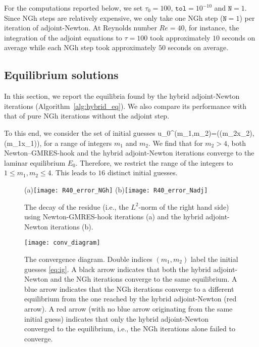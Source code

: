 \documentclass{jfm}
\begin{document}
For the computations reported below, we set $\tau_0=100$, $\texttt{tol}=10^{-10}$ and
$\texttt{N}=1$. Since NGh steps are relatively expensive, we only take one NGh step
($\texttt{N}=1$) per iteration of
adjoint-Newton.
At Reynolds number $Re=40$, for instance, the integration of the adjoint equations
to $\tau=100$
took approximately $10$ seconds on average while each NGh step took approximately $50$ seconds
on average.

\subsection{Equilibrium solutions}
In this section, we report the equilibria found by the hybrid adjoint-Newton iterations
(Algorithm~\ref{alg:hybrid_eq}).
We also compare its performance with that of pure NGh iterations without the
adjoint step.

To this end, we consider the set of initial guesses
\beq
\vc u_0^{(m_1,m_2)}=\big(\cos(m_2x_2),\cos(m_1x_1)\big),
\label{eq:ig}
\eeq
for a range of integers $m_1$ and $m_2$. We find that for $m_2>4$, both Newton--GMRES-hook
and the hybrid adjoint-Newton iterations converge to the laminar equilibrium $E_0$. Therefore, we
restrict the range of the integers to $1\leq m_1,m_2\leq 4$. This leads to $16$ distinct
initial guesses.
%
\begin{figure}
\centering
(a)\texttt{[image: R40\_error\_NGh]}
(b)\texttt{[image: R40\_error\_Nadj]}
\caption{The decay of the residue (i.e., the $L^2$-norm of the right hand side) using
Newton-GMRES-hook iterations (a) and the hybrid
adjoint-Newton iterations (b).}
\label{fig:NGh_vs_adjN}
\end{figure}

\begin{figure}
\centering
\texttt{[image: conv\_diagram]}
\caption{
The convergence diagram. Double indices $(m_1,m_2)$ label the initial guesses
\eqref{eq:ig}.
A black arrow indicates that both the hybrid adjoint-Newton and the NGh
iterations converge to the same equilibrium.
A blue arrow indicates that the NGh iterations converge to a different
equilibrium from the one reached by the hybrid adjoint-Newton (red
arrow).
A red arrow (with no blue arrow originating from the same initial guess)
indicates that only the hybrid adjoint-Newton converged to the equilibrium,
i.e., the NGh iterations alone failed to converge.
        }
\label{fig:EQ_diag}
\end{figure}
\end{document}
